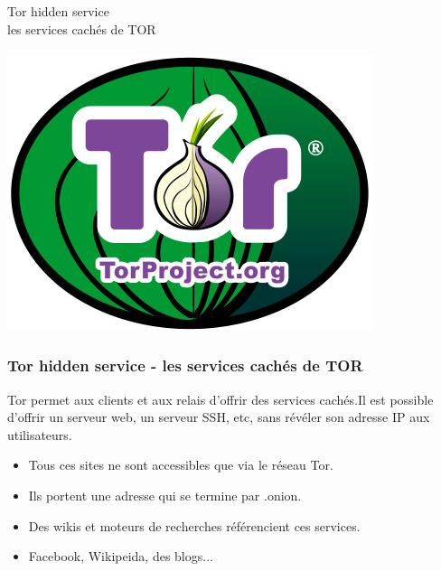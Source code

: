 \documentclass{beamer}
\begin{document}
\begin{frame}
\begin{center}
\Huge{Tor hidden service \\ les services cachés de TOR}
\\~\\ \includegraphics[scale=0.4]{./images/logo_tor.jpg}
\end{center}
\end{frame}
\begin{frame}
\frametitle{Tor hidden service - les services cachés de TOR}
Tor permet aux clients et aux relais d’offrir des services cachés.Il est possible d'offrir un serveur web, un serveur SSH, etc, sans révéler son adresse IP aux utilisateurs.
\begin{itemize}
\item Tous ces sites ne sont accessibles que via le réseau Tor.
\item Ils portent une adresse qui se termine par .onion.
\item Des wikis et moteurs de recherches référencient ces services.
\item Facebook, Wikipeida, des blogs...
\end{itemize}
\end{frame}
\end{document}
